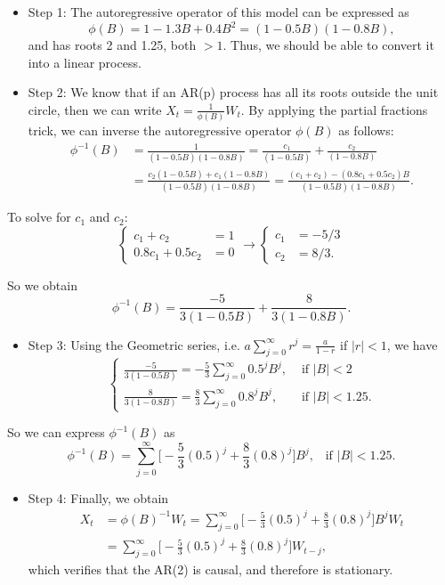 \documentclass[]{book}
\providecommand{\tightlist}{%
  \setlength{\itemsep}{0pt}\setlength{\parskip}{0pt}}
\theoremstyle{definition}
\theoremstyle{definition}
\theoremstyle{definition}
\theoremstyle{remark}
\begin{document}
\begin{itemize}
\item
  Step 1: The autoregressive operator of this model can be expressed as
  \[
  \phi(B) = 1-1.3B+0.4B^2 = (1-0.5B)(1-0.8B),
  \] and has roots 2 and 1.25, both \(>1\). Thus, we should be able to
  convert it into a linear process.
\item
  Step 2: We know that if an AR(p) process has all its roots outside the
  unit circle, then we can write \(X_t = \frac{1}{\phi(B)} W_t\). By
  applying the partial fractions trick, we can inverse the
  autoregressive operator \(\phi(B)\) as follows: \[ \begin{aligned}
  \phi^{-1}(B) &= \frac{1}{(1-0.5B)(1-0.8B)} = \frac{c_1}{(1-0.5B)} + \frac{c_2}{(1-0.8B)} \\
  &= \frac{c_2(1-0.5B) + c_1(1-0.8B)}{(1-0.5B)(1-0.8B)} = \frac{(c_1 + c_2)-(0.8c_1+0.5c_2)B}{(1-0.5B)(1-0.8B)}.
  \end{aligned} \]
\end{itemize}

To solve for \(c_1\) and \(c_2\): \[ \begin{cases}
      c_1 + c_2 &=1\\
      0.8c_1+0.5c_2 &=0
\end{cases} \to 
\begin{cases}
      c_1 &= -5/3\\
      c_2 &= 8/3.
\end{cases} \]

So we obtain \[
\phi^{-1}(B) = \frac{-5}{3(1-0.5B)} + \frac{8}{3(1-0.8B)}.
\]

\begin{itemize}
\tightlist
\item
  Step 3: Using the Geometric series, i.e.
  \(a\sum_{j=0}^{\infty} r^j = \frac{a}{1-r}\) if \(|r| <1\), we have
  \[ \begin{cases}
      \frac{-5}{3(1-0.5B)} = -\frac{5}{3} \sum_{j=0}^\infty 0.5^j B^j, &\mbox{ if } |B| < 2 \\
      \frac{8}{3(1-0.8B)} = \frac{8}{3} \sum_{j=0}^\infty 0.8^j B^j, &\mbox{ if } |B| < 1.25.
  \end{cases} \]
\end{itemize}

So we can express \(\phi^{-1}(B)\) as \[
\phi^{-1}(B) = \sum_{j=0}^\infty \Big[ -\frac{5}{3} (0.5)^j  + \frac{8}{3} (0.8)^j \Big] B^j, \;\;\; \text{if  } |B|<1.25.
\]

\begin{itemize}
\tightlist
\item
  Step 4: Finally, we obtain \[ \begin{aligned}
  X_t &= \phi(B)^{-1} W_t = \sum_{j=0}^\infty \Big[ -\frac{5}{3} (0.5)^j  + \frac{8}{3} (0.8)^j \Big] B^j W_t \\
  &= \sum_{j=0}^\infty \Big[ -\frac{5}{3} (0.5)^j  + \frac{8}{3} (0.8)^j \Big] W_{t-j},
  \end{aligned} \] which verifies that the AR(2) is causal, and
  therefore is stationary.

\end{itemize}
\end{document}
